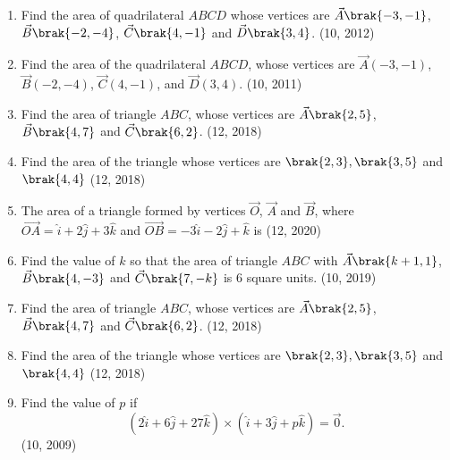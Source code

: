 \begin{enumerate}[label=\thesubsection.\arabic*, ref=\thesubsection.\theenumi]
\item Find the area of quadrilateral $ABCD$ whose vertices are $\vec{A}\brak{-3, -1}$,  $\vec{B}\brak{-2, -4}$,  $\vec{C}\brak{4, -1}$ and $\vec{D}\brak{3, 4}$.
\hfill (10,  2012)
\item Find the area of the quadrilateral $ABCD$,  whose vertices are $\vec{A}(-3,  -1)$,  $\vec{B}(-2,  -4)$,  $\vec{C}(4,  -1)$,  and $\vec{D}(3,  4)$.
\hfill (10,  2011)
\item Find the area of triangle $ABC$,  whose vertices are $\vec{A}\brak{2,  5}$,  $\vec{B}\brak{4,  7}$ and $\vec{C}\brak{6,  2}$.
\hfill (12,  2018)
\item Find the area of the triangle whose vertices are $\brak{2, 3}, \brak{3, 5}$ and $\brak{4, 4}$
\hfill (12,  2018)
\item The area of a triangle formed by vertices $\vec{O}$,  $\vec{A}$ and $\vec{B}$,  where $\overrightarrow{OA}= \hat{i}+2 \hat{j}+3\hat{k}$ and $\overrightarrow{OB}= -3\hat{i} - 2\hat{j} + \hat{k}$ is
\hfill (12,  2020)
\item Find the value of $k$ so that the area of triangle $ABC$ with $\vec{A}\brak{k + 1,  1}$,  $\vec{B}\brak{4,  -3}$ and $\vec{C}\brak{7,  -k}$ is $6$ square units.
\hfill (10,  2019)
\item Find the area of triangle $ABC$,  whose vertices are $\vec{A}\brak{2,  5}$,  $\vec{B}\brak{4,  7}$ and $\vec{C}\brak{6,  2}$.
\hfill (12,  2018)
\item Find the area of the triangle whose vertices are $\brak{2, 3}, \brak{3, 5}$ and $\brak{4, 4}$
\hfill (12,  2018)
\item 
Find the value of $p$ if 
$$(2\hat{i} + 6\hat{j} + 27\hat{k}) \times (\hat{i} + 3\hat{j} + p\hat{k}) = \vec{0}.$$
\hfill	(10, 2009)

\end{enumerate}
